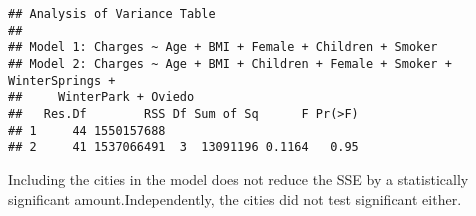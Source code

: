 \documentclass[
]{article}
\begin{document}
\begin{verbatim}
## Analysis of Variance Table
## 
## Model 1: Charges ~ Age + BMI + Female + Children + Smoker
## Model 2: Charges ~ Age + BMI + Children + Female + Smoker + WinterSprings + 
##     WinterPark + Oviedo
##   Res.Df        RSS Df Sum of Sq      F Pr(>F)
## 1     44 1550157688                           
## 2     41 1537066491  3  13091196 0.1164   0.95
\end{verbatim}

Including the cities in the model does not reduce the SSE by a
statistically significant amount.Independently, the cities did not test
significant either.
\end{document}
